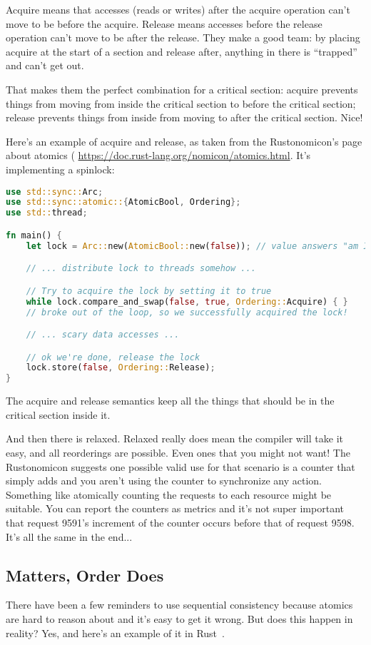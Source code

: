 Acquire means that accesses (reads or writes) after the acquire operation can't move to be before the acquire. Release means accesses before the release operation can't move to be after the release. They make a good team: by placing acquire at the start of a section and release after, anything in there is ``trapped'' and can't get out.

That makes them the perfect combination for a critical section: acquire prevents things from moving from inside the critical section to before the critical section; release prevents things from inside from moving to after the critical section. Nice! 

Here's an example of acquire and release, as taken from the Rustonomicon's page about atomics ( \url{https://doc.rust-lang.org/nomicon/atomics.html}. It's implementing a spinlock: 

\begin{lstlisting}[language=Rust]
use std::sync::Arc;
use std::sync::atomic::{AtomicBool, Ordering};
use std::thread;

fn main() {
    let lock = Arc::new(AtomicBool::new(false)); // value answers "am I locked?"

    // ... distribute lock to threads somehow ...

    // Try to acquire the lock by setting it to true
    while lock.compare_and_swap(false, true, Ordering::Acquire) { }
    // broke out of the loop, so we successfully acquired the lock!

    // ... scary data accesses ...

    // ok we're done, release the lock
    lock.store(false, Ordering::Release);
}
\end{lstlisting}

The acquire and release semantics keep all the things that should be in the critical section inside it.

And then there is relaxed. Relaxed really does mean the compiler will take it easy, and all reorderings are possible. Even ones that you might not want! The Rustonomicon suggests one possible valid use for that scenario is a counter that simply adds and you aren't using the counter to synchronize any action. Something like atomically counting the requests to each resource might be suitable. You can report the counters as metrics and it's not super important that request 9591's increment of the counter occurs before that of request 9598. It's all the same in the end...

\subsection*{Matters, Order Does}
There have been a few reminders to use sequential consistency because atomics are hard to reason about and it's easy to get it wrong. But does this happen in reality? Yes, and here's an example of it in Rust~\cite{weakbug}.

